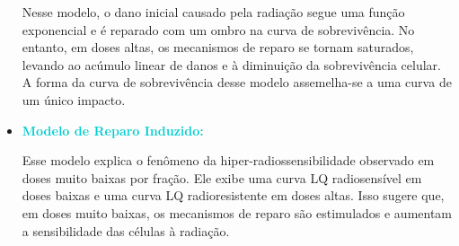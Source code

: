 \documentclass[11pt,a4paper]{article}
\begin{document}
\begin{itemize}
		Nesse modelo, o dano inicial causado pela radiação segue uma função exponencial e é reparado com um ombro na curva de sobrevivência. No entanto, em doses altas, os mecanismos de reparo se tornam saturados, levando ao acúmulo linear de danos e à diminuição da sobrevivência celular. A forma da curva de sobrevivência desse modelo assemelha-se a uma curva de um único impacto.
		
		\item \textcolor{DarkTurquoise}{\textbf{Modelo de Reparo Induzido:}}
		
		Esse modelo explica o fenômeno da hiper-radiossensibilidade observado em doses muito baixas por fração. Ele exibe uma curva LQ radiosensível em doses baixas e uma curva LQ radioresistente em doses altas. Isso sugere que, em doses muito baixas, os mecanismos de reparo são estimulados e aumentam a sensibilidade das células à radiação.
	\end{itemize}




\end{document}
